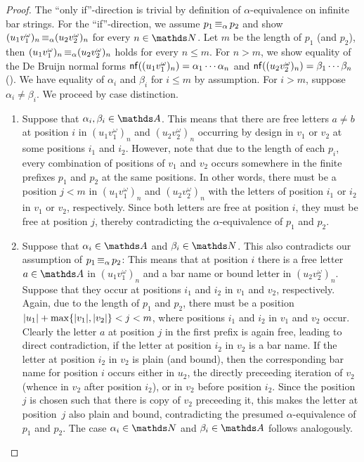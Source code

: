 \documentclass[a4paper,UKenglish,cleveref,autoref,thm-restate,numberwithinsect,final]{lipics-v2021}
\begin{document}
    \begin{proof}
        The \enquote{only if}-direction is trivial by definition of $\alpha$-equivalence on infinite bar strings.
        For the \enquote{if}-direction, we assume $p_1 \operatorname{\equiv_{\alpha}} p_2$ and show $(u_1v_1^\omega)_n \operatorname{\equiv_{\alpha}}
        (u_2v_2^\omega)_n$ for every $n \in \Nat$. Let $m$ be the length of $p_1$ (and $p_2$), then
        $(u_1v_1^\omega)_n \operatorname{\equiv_{\alpha}} (u_2v_2^\omega)_n$ holds for every $n \leqslant m$. For $n > m$, we show
        equality of the De Bruijn normal forms $\mathsf{nf}((u_1v_1^\omega)_n) = \alpha_1 \cdots \alpha_n$ and
        $\mathsf{nf}((u_2v_2^\omega)_n) = \beta_1 \cdots \beta_n$ (). We have equality
        of $\alpha_i$ and $\beta_i$ for $i \leqslant m$ by assumption. For $i > m$, suppose $\alpha_i \neq \beta_i$.
        We proceed by case distinction.
        \begin{enumerate}
        \item Suppose that $\alpha_i, \beta_i \in \names$. This means that there are free letters
        $a \neq b$ at position $i$ in $(u_1v_1^\omega)_n$ and $(u_2v_2^\omega)_n$ occurring by design in $v_1$ or $v_2$
        at some positions $i_1$ and $i_2$. However, note that due to the length of each $p_i$, every combination of
        positions of $v_1$ and $v_2$ occurs somewhere in the finite prefixes $p_1$ and $p_2$ at the same positions.
        In other words, there must be a position $j < m$ in $(u_1v_1^\omega)_n$ and $(u_2v_2^\omega)_n$ with the
        letters of position $i_1$ or $i_2$ in $v_1$ or $v_2$, 
        respectively. Since both letters are free at position $i$, they must be free at position $j$, thereby
        contradicting the $\alpha$-equivalence of $p_1$ and $p_2$.

      \item Suppose that $\alpha_i \in \names$ and $\beta_i \in \Nat$. This also contradicts our assumption of $p_1
        \operatorname{\equiv_{\alpha}} p_2$: This means that at position $i$ there is a free letter $a \in \names$ in $(u_1v_1^\omega)_n$
        and a bar name or bound letter in $(u_2v_2^\omega)_n$. Suppose  that they occur at positions $i_1$ and $i_2$ in $v_1$  and $v_2$, respectively. Again, due to the length of $p_1$ and $p_2$, there must be a position $\abs{u_1} +  \max\set{\abs{v_1}, \abs{v_2}} < j < m$, where positions $i_1$ and $i_2$ in $v_1$ and $v_2$ occur.
        Clearly the letter $a$ at position $j$ in the first prefix is again free, leading to direct contradiction, if the letter at position $i_2$ in $v_2$ is a bar name.
        If the letter at position $i_2$ in $v_2$ is plain (and bound), then the corresponding bar name for position $i$ occurs either in $u_2$, the directly preceeding iteration of $v_2$ (whence in $v_2$ after position $i_2$), or in $v_2$ before position $i_2$.
        Since the position $j$ is chosen such that there is copy of $v_2$ preceeding it, this makes the letter at position~$j$ also plain and bound, contradicting the presumed $\alpha$-equivalence of $p_1$ and $p_2$.
        The case $\alpha_i \in \Nat$ and $\beta_i \in \names$ follows analogously.


\end{enumerate}
\end{proof}
\end{document}
